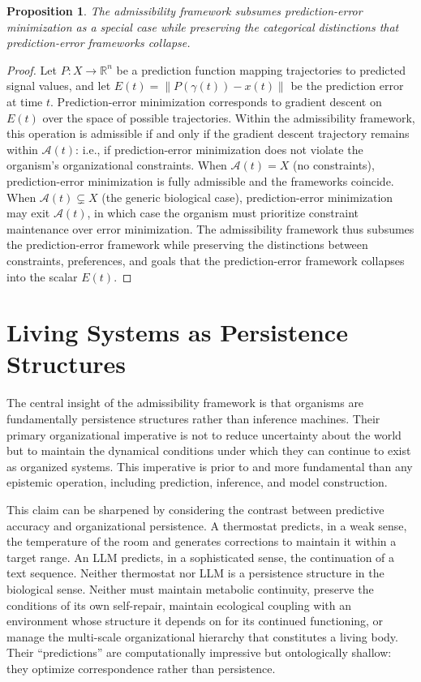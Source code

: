 \documentclass[12pt,a4paper]{report}
\theoremstyle{flyxion}
\newtheorem{proposition}[theorem]{Proposition}
\begin{document}
\begin{proposition}
The admissibility framework subsumes prediction-error minimization as a special case while preserving the categorical distinctions that prediction-error frameworks collapse.
\end{proposition}

\begin{proof}
Let $P : X \rightarrow \mathbb{R}^n$ be a prediction function mapping trajectories to predicted signal values, and let $E(t) = \|P(\gamma(t)) - x(t)\|$ be the prediction error at time $t$. Prediction-error minimization corresponds to gradient descent on $E(t)$ over the space of possible trajectories. Within the admissibility framework, this operation is admissible if and only if the gradient descent trajectory remains within $\mathcal{A}(t)$: i.e., if prediction-error minimization does not violate the organism's organizational constraints. When $\mathcal{A}(t) = X$ (no constraints), prediction-error minimization is fully admissible and the frameworks coincide. When $\mathcal{A}(t) \subsetneq X$ (the generic biological case), prediction-error minimization may exit $\mathcal{A}(t)$, in which case the organism must prioritize constraint maintenance over error minimization. The admissibility framework thus subsumes the prediction-error framework while preserving the distinctions between constraints, preferences, and goals that the prediction-error framework collapses into the scalar $E(t)$.
\end{proof}

\section{Living Systems as Persistence Structures}

The central insight of the admissibility framework is that organisms are fundamentally persistence structures rather than inference machines. Their primary organizational imperative is not to reduce uncertainty about the world but to maintain the dynamical conditions under which they can continue to exist as organized systems. This imperative is prior to and more fundamental than any epistemic operation, including prediction, inference, and model construction.

This claim can be sharpened by considering the contrast between predictive accuracy and organizational persistence. A thermostat predicts, in a weak sense, the temperature of the room and generates corrections to maintain it within a target range. An LLM predicts, in a sophisticated sense, the continuation of a text sequence. Neither thermostat nor LLM is a persistence structure in the biological sense. Neither must maintain metabolic continuity, preserve the conditions of its own self-repair, maintain ecological coupling with an environment whose structure it depends on for its continued functioning, or manage the multi-scale organizational hierarchy that constitutes a living body. Their ``predictions'' are computationally impressive but ontologically shallow: they optimize correspondence rather than persistence.
\end{document}
